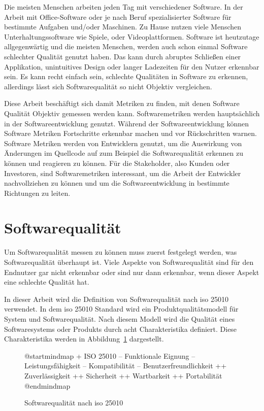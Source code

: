 \documentclass[12pt, a4paper, ngerman]{article}
\begin{document}
Die meisten Menschen arbeiten jeden Tag mit verschiedener Software.
In der Arbeit mit Office-Software oder je nach Beruf spezialisierter
Software für bestimmte Aufgaben und/oder Maschinen.
Zu Hause nutzen viele Menschen Unterhaltungssoftware wie Spiele,
oder Videoplattformen.
Software ist heutzutage allgegenwärtig und die meisten Menschen,
werden auch schon einmal Software schlechter Qualität genutzt haben.
Das kann durch abruptes Schließen einer Applikation,
unintuitives Design oder langer Ladezeiten
für den Nutzer erkennbar sein.
Es kann recht einfach sein,
schlechte Qualitäten in Software zu erkennen,
allerdings lässt sich Softwarequalität so nicht Objektiv vergleichen.

Diese Arbeit beschäftigt sich damit Metriken zu finden,
mit denen Software Qualität Objektiv gemessen werden kann.
Softwaremetriken werden hauptsächlich
in der Softwareentwicklung genutzt.
Während der Softwareentwicklung können Software Metriken
Fortschritte erkennbar machen und vor Rückschritten warnen.
Software Metriken werden von Entwicklern genutzt,
um die Auswirkung von Änderungen im Quellcode auf zum Beispiel die Softwarequalität
erkennen zu können und reagieren zu können.
Für die Stakeholder, also Kunden oder Investoren,
sind Softwaremetriken interessant, 
um die Arbeit der Entwickler nachvollziehen zu können
und um die Softwareentwicklung in bestimmte Richtungen zu leiten.

\section{Softwarequalität}

Um Softwarequalität messen zu können muss zuerst festgelegt werden,
was Softwarequalität überhaupt ist.
Viele Aspekte von Softwarequalität sind für den Endnutzer gar nicht
erkennbar oder sind nur dann erkennbar,
wenn dieser Aspekt eine schlechte Qualität hat.

In dieser Arbeit wird die Definition von Softwarequalität
nach \ac{iso} 25010~\cite{ISO25010} verwendet.
In dem \ac{iso} 25010 Standard wird ein Produktqualitätsmodell
für System und Softwarequalität.
Nach diesem Modell wird die Qualität eines Softwaresystems oder Produkts
durch acht Charakteristika definiert.
Diese Charakteristika werden in Abbildung~\ref*{fig:uml:softwarequality} dargestellt.

\begin{figure}
  \centering
  \begin{plantuml}
    @startmindmap
    + ISO 25010 
    -- Funktionale Eignung
    -- Leistungsfähigkeit
    -- Kompatibilität
    -- Benutzerfreundlichkeit
    ++ Zuverlässigkeit
    ++ Sicherheit
    ++ Wartbarkeit
    ++ Portabilität
    @endmindmap
  \end{plantuml}
  \caption{Softwarequalität nach \ac{iso} 25010~\cite{ISO25010}}
  \label{fig:uml:softwarequality}
\end{figure}
\end{document}
